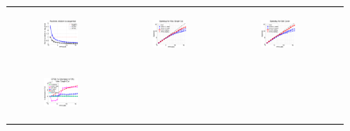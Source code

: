 \documentclass{article} %
\begin{document}
\begin{figure}[ht]
  \centering
  \begin{tabular}{cccc}
	  \begin{subfigure}[h]{0.30\textwidth}
	  	\includegraphics[width=130pt]{images/summary_relruntime.pdf}
			\caption{}
			\label{fig:relruntime}
	  \end{subfigure} &
	  \begin{subfigure}[h]{0.30\textwidth}
	  	\includegraphics[width=130pt]{images/summary_speedup_maxgraphcut.pdf}
			\caption{}
			\label{fig:speedup_maxgraphcut}
	  \end{subfigure} &
	  \begin{subfigure}[h]{0.30\textwidth}
	  	\includegraphics[width=130pt]{images/summary_speedup_setcover.pdf}
			\caption{}
			\label{fig:speedup_setcover}
	  \end{subfigure} \\
	  \begin{subfigure}[h]{0.30\textwidth}
	  	\includegraphics[width=130pt]{images/summary_diffFA_maxgraphcut.pdf}

\end{subfigure}
\end{tabular}
\end{figure}
\end{document}
